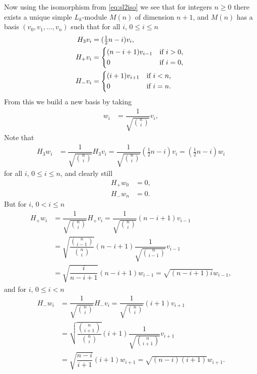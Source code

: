 Now using the isomorphism from \cref{eq:sl2iso} we see that for integers $n\geq 0$ there exists a unique simple $L_k$-module $M(n)$ of dimension $n+1$, and $M(n)$ has a basis $(v_0,v_1,\dotsc,v_n)$ such that for all $i$, $0\leq i\leq n$
\begin{align*}
  H_3v_i &= (\tfrac{1}{2}n-i)v_i, \\
  H_+v_i &=
          \begin{dcases*}
            (n-i+1)v_{i-1} & if $i>0$, \\
            0 & if $i=0$,
          \end{dcases*} \\
  H_-v_i &=
          \begin{dcases*}
            (i+1)v_{i+1} & if $i<n$, \\
            0 & if $i=n$.
          \end{dcases*}
\end{align*}
From this we build a new basis by taking
\begin{align*}
  w_i &= \dfrac{1}{\sqrt{\binom{n}{i}}}v_i,
\end{align*}
Note that
\begin{align*}
  H_3w_i &= \dfrac{1}{\sqrt{\binom{n}{i}}}H_3v_i = \dfrac{1}{\sqrt{\binom{n}{i}}}(\tfrac{1}{2}n-i)v_i = (\tfrac{1}{2}n-i)w_i
\end{align*}
for all $i$, $0\leq i\leq n$, and clearly still
\begin{align*}
  H_+w_0 &= 0, \\
  H_-w_n &= 0.
\end{align*}
But for $i$, $0<i\leq n$
\begin{align*}
  H_+w_i &= \dfrac{1}{\sqrt{\binom{n}{i}}}H_+v_i = \dfrac{1}{\sqrt{\binom{n}{i}}}(n-i+1)v_{i-1} \\
         &= \sqrt{\dfrac{\binom{n}{i-1}}{\binom{n}{i}}}(n-i+1)\dfrac{1}{\sqrt{\binom{n}{i-1}}}v_{i-1} \\
  &= \sqrt{\dfrac{i}{n-i+1}}(n-i+1)w_{i-1} = \sqrt{(n-i+1)i}w_{i-1},
\end{align*}
and for $i$, $0\leq i<n$
\begin{align*}
  H_-w_i &= \dfrac{1}{\sqrt{\binom{n}{i}}}H_-v_i = \dfrac{1}{\sqrt{\binom{n}{i}}}(i+1)v_{i+1} \\
         &= \sqrt{\dfrac{\binom{n}{i+1}}{\binom{n}{i}}}(i+1)\dfrac{1}{\sqrt{\binom{n}{i+1}}}v_{i+1} \\
  &= \sqrt{\dfrac{n-i}{i+1}}(i+1)w_{i+1} = \sqrt{(n-i)(i+1)}w_{i+1}.
\end{align*}


